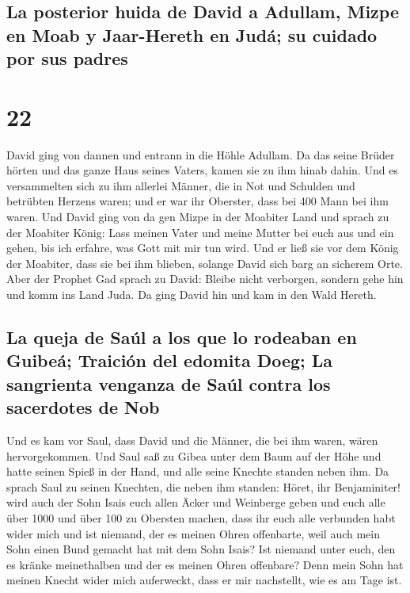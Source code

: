 \hypertarget{la-posterior-huida-de-david-a-adullam-mizpe-en-moab-y-jaar-hereth-en-juduxe1-su-cuidado-por-sus-padres}{%
\subsection{La posterior huida de David a Adullam, Mizpe en Moab y
Jaar-Hereth en Judá; su cuidado por sus
padres}\label{la-posterior-huida-de-david-a-adullam-mizpe-en-moab-y-jaar-hereth-en-juduxe1-su-cuidado-por-sus-padres}}

\hypertarget{section-21}{%
\section{22}\label{section-21}}

 David ging von dannen und entrann in die Höhle Adullam.
Da das seine Brüder hörten und das ganze Haus seines Vaters, kamen sie
zu ihm hinab dahin.  Und es versammelten sich zu ihm
allerlei Männer, die in Not und Schulden und betrübten Herzens waren;
und er war ihr Oberster, dass bei 400 Mann bei ihm waren. 
Und David ging von da gen Mizpe in der Moabiter Land und sprach zu der
Moabiter König: Lass meinen Vater und meine Mutter bei euch aus und ein
gehen, bis ich erfahre, was Gott mit mir tun wird.  Und er
ließ sie vor dem König der Moabiter, dass sie bei ihm blieben, solange
David sich barg an sicherem Orte.  Aber der Prophet Gad
sprach zu David: Bleibe nicht verborgen, sondern gehe hin und komm ins
Land Juda. Da ging David hin und kam in den Wald Hereth.

\hypertarget{la-queja-de-sauxfal-a-los-que-lo-rodeaban-en-guibeuxe1-traiciuxf3n-del-edomita-doeg-la-sangrienta-venganza-de-sauxfal-contra-los-sacerdotes-de-nob}{%
\subsection{La queja de Saúl a los que lo rodeaban en Guibeá; Traición
del edomita Doeg; La sangrienta venganza de Saúl contra los sacerdotes
de
Nob}\label{la-queja-de-sauxfal-a-los-que-lo-rodeaban-en-guibeuxe1-traiciuxf3n-del-edomita-doeg-la-sangrienta-venganza-de-sauxfal-contra-los-sacerdotes-de-nob}}

 Und es kam vor Saul, dass David und die Männer, die bei
ihm waren, wären hervorgekommen. Und Saul saß zu Gibea unter dem Baum
auf der Höhe und hatte seinen Spieß in der Hand, und alle seine Knechte
standen neben ihm.  Da sprach Saul zu seinen Knechten, die
neben ihm standen: Höret, ihr Benjaminiter! wird auch der Sohn Isais
euch allen Äcker und Weinberge geben und euch alle über 1000 und über
100 zu Obersten machen,  dass ihr euch alle verbunden habt
wider mich und ist niemand, der es meinen Ohren offenbarte, weil auch
mein Sohn einen Bund gemacht hat mit dem Sohn Isais? Ist niemand unter
euch, den es kränke meinethalben und der es meinen Ohren offenbare? Denn
mein Sohn hat meinen Knecht wider mich auferweckt, dass er mir
nachstellt, wie es am Tage ist.

